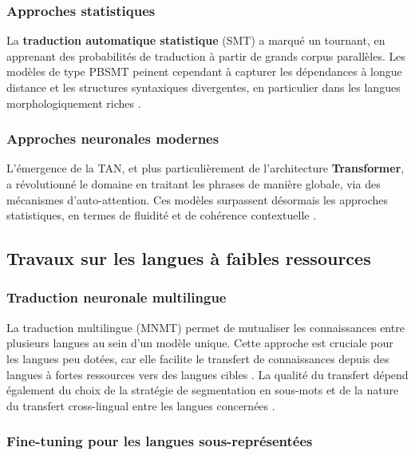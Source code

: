 \subsubsection{Approches statistiques}

La \textbf{traduction automatique statistique} (\ac{SMT}) a marqué un tournant, en apprenant des probabilités de traduction à partir de grands corpus parallèles. Les modèles de type \ac{PBSMT} peinent cependant à capturer les dépendances à longue distance et les structures syntaxiques divergentes, en particulier dans les langues morphologiquement riches \cite{lalrempuii2021improved, chanambam2022}.

\subsubsection{Approches neuronales modernes}

L'émergence de la \ac{TAN}, et plus particulièrement de l'architecture \textbf{Transformer}, a révolutionné le domaine en traitant les phrases de manière globale, via des mécanismes d'auto-attention. Ces modèles surpassent désormais les approches statistiques, en termes de fluidité et de cohérence contextuelle \cite{vaswani2017attention, ranathunga2023neural}.

\subsection{Travaux sur les langues à faibles ressources}

\subsubsection{Traduction neuronale multilingue}

La traduction multilingue (\ac{MNMT}) permet de mutualiser les connaissances entre plusieurs langues au sein d'un modèle unique. Cette approche est cruciale pour les langues peu dotées, car elle facilite le transfert de connaissances depuis des langues à fortes ressources vers des langues cibles \cite{ali2026hybrid, baladaspanda2023improving}. La qualité du transfert dépend également du choix de la stratégie de segmentation en sous-mots et de la nature du transfert cross-lingual entre les langues concernées \cite{meyer2024systematic, toraman2022impact}.

\subsubsection{Fine-tuning pour les langues sous-représentées}

